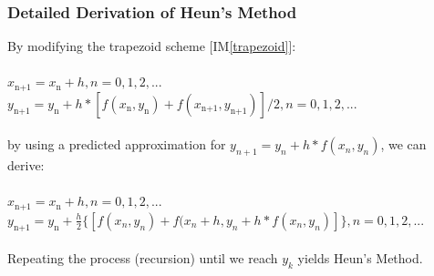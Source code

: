 \documentclass[12pt]{article}
\newcommand{\iref}[1]{IM\ref{#1}}
\begin{document}
\newpage

\subsubsection*{Detailed Derivation of Heun's Method}

By modifying the trapezoid scheme [\iref{trapezoid}]:\\
\\
\hspace*{2ex}$x_\text{n+1} = x_\text{n} + h, n = 0, 1, 2,...$\\
\hspace*{2ex}$y_\text{n+1} = y_\text{n} + h*[f(x_\text{n}, y_\text{n})+f(x_\text{n+1},
y_\text{n+1})] / 2, n = 0, 1, 2,...$\\
\\
by using a predicted approximation for $y_{n+1} = y_n + h * f(x_n, y_n)$, we can derive:\\
\\
\hspace*{2ex}$x_\text{n+1} = x_\text{n} + h, n = 0, 1, 2,...$\\
\hspace*{2ex}$y_\text{n+1} = y_\text{n} + \frac{h}{2}\{[f(x_n, y_n) + f(x_n + h, y_n + h*f(x_n, y_n)]\}, n = 0, 1, 2,...$\\
\\
Repeating the process (recursion) until we reach $y_k$ yields Heun's Method.\\

~\newline

\end{document}
